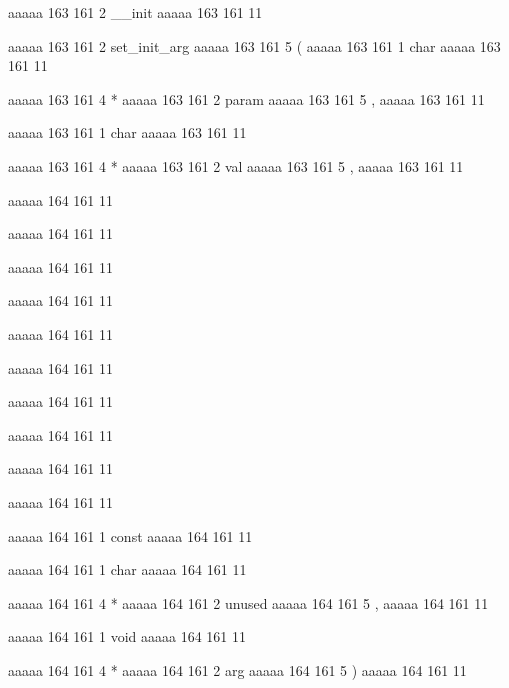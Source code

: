 aaaaa 163 161
2
__init
aaaaa 163 161
11
 
aaaaa 163 161
2
set_init_arg
aaaaa 163 161
5
(
aaaaa 163 161
1
char
aaaaa 163 161
11
 
aaaaa 163 161
4
*
aaaaa 163 161
2
param
aaaaa 163 161
5
,
aaaaa 163 161
11
 
aaaaa 163 161
1
char
aaaaa 163 161
11
 
aaaaa 163 161
4
*
aaaaa 163 161
2
val
aaaaa 163 161
5
,
aaaaa 163 161
11


aaaaa 164 161
11
	
aaaaa 164 161
11
	
aaaaa 164 161
11
	
aaaaa 164 161
11
 
aaaaa 164 161
11
 
aaaaa 164 161
11
 
aaaaa 164 161
11
 
aaaaa 164 161
11
 
aaaaa 164 161
11
 
aaaaa 164 161
11
 
aaaaa 164 161
1
const
aaaaa 164 161
11
 
aaaaa 164 161
1
char
aaaaa 164 161
11
 
aaaaa 164 161
4
*
aaaaa 164 161
2
unused
aaaaa 164 161
5
,
aaaaa 164 161
11
 
aaaaa 164 161
1
void
aaaaa 164 161
11
 
aaaaa 164 161
4
*
aaaaa 164 161
2
arg
aaaaa 164 161
5
)
aaaaa 164 161
11


